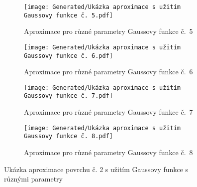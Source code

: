 \begin{landscapeimagepage}
    \begin{figure}[H]
        \centering
        \begin{subfigure}{.5\textheight}
            \centering
            \texttt{[image: Generated/Ukázka aproximace s užitím Gaussovy funkce č. 5.pdf]}
            \caption{Aproximace pro různé parametry Gaussovy funkce č.~5}
            \label{fig:Ukázka aproximace povrchu s užitím Gaussovy funkce č. 5}
        \end{subfigure}
        \vspace{0.5cm}
        \hspace{2.5cm}
        \begin{subfigure}{.5\textheight}
            \centering
            \texttt{[image: Generated/Ukázka aproximace s užitím Gaussovy funkce č. 6.pdf]}
            \caption{Aproximace pro různé parametry Gaussovy funkce č.~6}
            \label{fig:Ukázka aproximace povrchu s užitím Gaussovy funkce č. 6}
        \end{subfigure}
        \vspace{0.5cm}
        \begin{subfigure}{.5\textheight}
            \centering
            \texttt{[image: Generated/Ukázka aproximace s užitím Gaussovy funkce č. 7.pdf]}
            \caption{Aproximace pro různé parametry Gaussovy funkce č.~7}
            \label{fig:Ukázka aproximace povrchu s užitím Gaussovy funkce č. 7}
        \end{subfigure}
        \hspace{2.5cm}
        \begin{subfigure}{.5\textheight}
            \centering
            \texttt{[image: Generated/Ukázka aproximace s užitím Gaussovy funkce č. 8.pdf]}
            \caption{Aproximace pro různé parametry Gaussovy funkce č.~8}
            \label{fig:Ukázka aproximace povrchu s užitím Gaussovy funkce č. 8}
        \end{subfigure}
        \caption{Ukázka aproximace povrchu č. 2 s užitím Gaussovy funkce s různými parametry}
        \label{fig:Ukázka aproximace povrchu č. 2 s užitím Gaussovy funkce s různými parametry}
    \end{figure}
\end{landscapeimagepage}